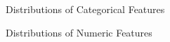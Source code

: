 \documentclass[
  letterpaper,
  DIV=11,
  numbers=noendperiod]{scrartcl}
\begin{document}
\begin{figure}


\caption{\label{fig-cat-dist}Distributions of Categorical Features}

\end{figure}%

\begin{figure}


\caption{\label{fig-num-dist}Distributions of Numeric Features}

\end{figure}%
\end{document}
